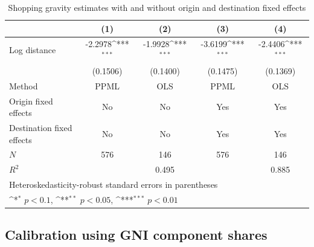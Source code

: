 \documentclass[12pt, unicode, a4paper]{article}
\newcommand{\1}{\mbox{1}\hspace{-0.25em}\mbox{l}} %
\begin{document}
\begin{table}[H]
    \centering
\small
\setlength{\tabcolsep}{4pt}
\def\sym#1{\ifmmode^{#1}\else\(^{#1}\)\fi}
\begin{tabular}{l*{4}{c}}
\hline\hline
            &\multicolumn{1}{c}{(1)}&\multicolumn{1}{c}{(2)}&\multicolumn{1}{c}{(3)}&\multicolumn{1}{c}{(4)}\\
\hline
Log distance&     -2.2978\sym{***}&     -1.9928\sym{***}&     -3.6199\sym{***}&     -2.4406\sym{***}\\
            &    (0.1506)         &    (0.1400)         &    (0.1475)         &    (0.1369)         \\
\hline
Method & PPML &  OLS & PPML &  OLS  \\ 
Origin fixed effects & No & No & Yes & Yes\\
Destination fixed effects & No & No & Yes & Yes\\
\(N\)       &         576         &         146         &         576         &         146         \\
\(R^{2}\)   &                     &       0.495         &                     &       0.885         \\
\hline\hline
\multicolumn{5}{l}{\footnotesize Heteroskedasticity-robust standard errors in parentheses}\\
\multicolumn{5}{l}{\footnotesize \sym{*} \(p<0.1\), \sym{**} \(p<0.05\), \sym{***} \(p<0.01\)}\\
\end{tabular}
\caption{Shopping gravity estimates with and without origin and destination fixed effects}\label{tab:gravity_shopping}
\end{table}

\clearpage

\subsection{Calibration using GNI component shares}\label{appsec:calibration_GNI}
\end{document}

